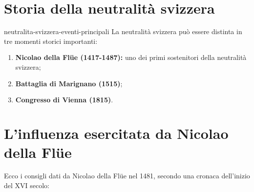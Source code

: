 \documentclass[preview]{standalone}
\begin{document}
\genpage

\section{Storia della neutralità svizzera}

\begin{snippet}{neutralita-svizzera-eventi-principali}
    La neutralità svizzera può essere distinta in tre momenti storici importanti:
    \begin{enumerate}
        \item \textbf{Nicolao della Flüe (1417-1487):} uno dei primi sostenitori della neutralità svizzera;
        \item \textbf{Battaglia di Marignano (1515)};
        \item \textbf{Congresso di Vienna (1815)}.
    \end{enumerate}
\end{snippet}

\section{L'influenza esercitata da Nicolao della Flüe}

\begin{plainhtml}
    Ecco i consigli dati da Nicolao della Flüe nel 1481, secondo una cronaca dell'inizio del XVI
    secolo:
\end{plainhtml}
\end{document}
